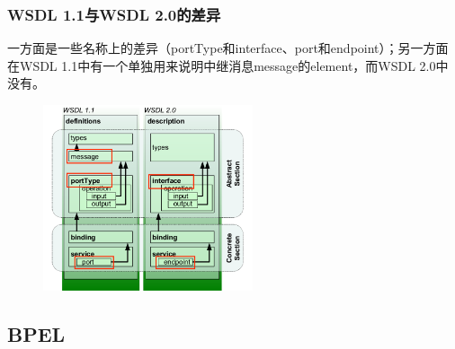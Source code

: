\subsubsection{WSDL 1.1与WSDL 2.0的差异}
一方面是一些名称上的差异（portType和interface、port和endpoint）；另一方面在WSDL 1.1中有一个单独用来说明中继消息message的element，而WSDL 2.0中没有。
\begin{figure}[H]
    \vspace{-0.7em}
	\centering
	\includegraphics[width=0.55\textwidth]{images/WSDL 1.1与WSDL 2.0的差异.png}
    \vspace{-1em}
\end{figure}

\subsection{BPEL}

